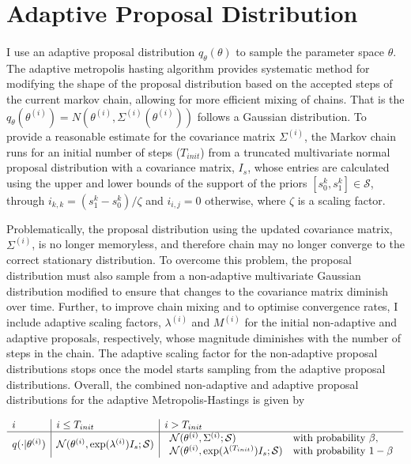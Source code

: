 
\section{Adaptive Proposal Distribution}

\paragraph{}I use an adaptive proposal distribution $q_\theta(\theta)$ to sample the parameter space $\theta$. The adaptive metropolis hasting algorithm provides systematic method for modifying the shape of the proposal distribution based on the accepted steps of the current markov chain, allowing for more efficient mixing of chains. That is the $q_\theta(\theta^{(i)}) = N(\theta^{(i)}, \Sigma^{(i)}(\theta^{(i)}))$ follows a Gaussian distribution. To provide a reasonable estimate for the covariance matrix $\Sigma^{(i)}$, the Markov chain runs for an initial number of steps ($T_{init}$) from a truncated multivariate normal proposal distribution with a covariance matrix, $I_s$, whose entries are calculated using the upper and lower bounds of the support of the priors $[s^k_0, s^k_1] \in \mathcal{S}$, through $i_{k,k} = (s^k_1 - s^k_0)/\zeta$ and $i_{i,j} = 0$ otherwise, where $\zeta$ is a scaling factor.
 
Problematically, the proposal distribution using the updated covariance matrix, $\Sigma^{(i)}$, is no longer memoryless, and therefore chain may no longer converge to the correct stationary distribution. To overcome this problem, the proposal distribution must also sample from a non-adaptive multivariate Gaussian distribution modified to ensure that changes to the covariance matrix diminish over time. Further, to improve chain mixing and to optimise convergence rates, I include adaptive scaling factors, $\lambda^{(i)}$ and $M^{(i)}$ for the initial non-adaptive and adaptive proposals, respectively, whose magnitude diminishes with the number of steps in the chain. The adaptive scaling factor for the non-adaptive proposal distributions stops once the model starts sampling from the adaptive proposal distributions. Overall, the combined non-adaptive and adaptive proposal distributions for the adaptive Metropolis-Hastings is given by

\begin{equation}
\begin{array}{l | l | l}
\label{eq:proposal}

i & i \leq T_{init} & i > T_{init} \\ \hline
q(\cdot|\theta^{(i)})&\mathcal{N}(\theta^{(i)}, \exp(\lambda^{(i)})I_{s};\mathcal{S})  &


\begin{array}{ll}
\mathcal{N}(\theta^{(i)}, \Sigma^{(i)};\mathcal{S}) & \text{with probability }\beta, \\
\mathcal{N}(\theta^{(i)}, \exp(\lambda^{(T_{init})})I_{s};\mathcal{S}) & \text{with probability }1 - \beta \\ 
\end{array}
 \end{array}
 \end{equation}
 
